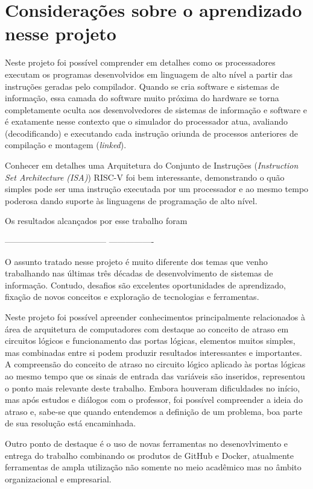 
\section{Considerações sobre o aprendizado nesse projeto}

Neste projeto foi possível comprender em detalhes como os processadores executam os programas desenvolvidos em linguagem de alto nível a partir das instruções geradas pelo compilador. Quando se cria software e sistemas de informação, essa camada do software muito próxima do hardware se torna completamente oculta aos desenvolvedores de sistemas de informação e software e é exatamente nesse contexto que o simulador do processador atua, avaliando (decodificando) e executando cada instrução oriunda de processos anteriores de compilação e montagem (\textit{linked}).

Conhecer em detalhes uma Arquitetura do Conjunto de Instruções (\textit{Instruction Set Architecture (ISA)}) RISC-V foi bem interessante, demonstrando o quão simples pode ser uma instrução executada por um processador e ao mesmo tempo poderosa dando suporte às linguagens de programação de alto nível.

Os resultados alcançados por esse trabalho foram  



------------------------------------ ---------------- 

O assunto tratado nesse projeto é muito diferente dos temas que venho trabalhando nas últimas três décadas
de desenvolvimento de sistemas de informação. Contudo, desafios são excelentes oportunidades de aprendizado, 
fixação de novos conceitos e exploração de tecnologias e ferramentas.

Neste projeto foi possível apreender conhecimentos principalmente relacionados à área de arquitetura de computadores 
com destaque ao conceito de atraso em circuitos lógicos e funcionamento das portas lógicas,
elementos muitos simples, mas combinadas entre si podem produzir resultados interessantes e importantes.
A compreensão do conceito de atraso no circuito lógico aplicado às portas lógicas 
ao mesmo tempo que os sinais de entrada das variáveis são inseridos, representou 
o ponto mais relevante deste trabalho. Embora houveram dificuldades no início, mas 
após estudos e diálogos com o professor, foi possível compreender a ideia do atraso e, sabe-se  que quando entendemos 
a definição de um problema, boa parte de sua resolução está encaminhada.

Outro ponto de destaque é o uso de novas ferramentas no desenovlvimento e entrega do trabalho combinando os produtos 
de GitHub e Docker, 
atualmente ferramentas de ampla utilização não somente no meio acadêmico mas no âmbito organizacional e empresarial.

